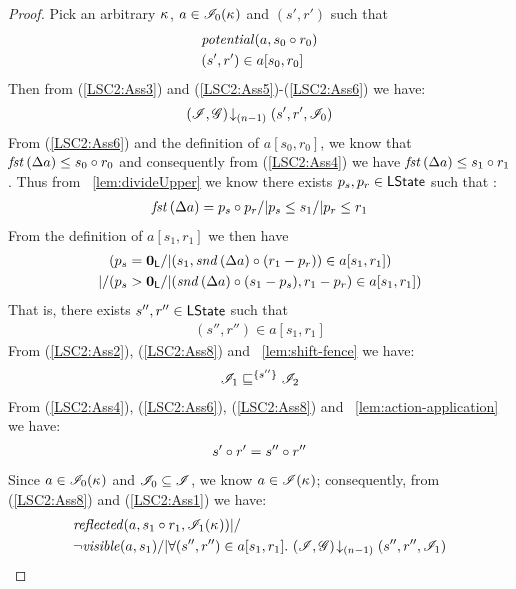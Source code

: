 \begin{lemma}
\begin{proof}
Pick an arbitrary $\kappa_{}$, $a \in \mathscr{I}_0(\kappa_{})$ and $(s', r')$ such that
%
\begin{align}
	& \mathit{potential}(a, s_0 \circ r_0) \label{LSC2:Ass5}\\
	& (s', r') \in a[s_0, r_0] \label{LSC2:Ass6}
\end{align}
Then from (\ref{LSC2:Ass3}) and (\ref{LSC2:Ass5})-(\ref{LSC2:Ass6}) we have:
%
\begin{align}
	\left(\mathscr{I}, \mathscr{G}\right) \!\downarrow_{(n-1)} \left(s', r', \mathscr{I}_0\right) \label{LSC2:Ass7}
\end{align}
%
From (\ref{LSC2:Ass6}) and the definition of $a[s_0, r_0]$, we know that $\mathit{fst}\left(\Delta {a}\right) \leq s_0 \circ r_0$ and consequently from (\ref{LSC2:Ass4}) we have $\mathit{fst}\left(\Delta {a}\right) \leq s_1 \circ r_1$. Thus from \lem~\ref{lem:divideUpper} we know there exists $p_s, p_r \in \textsf{LState}$ such that : 
%
\begin{align*}
	\mathit{fst}\left(\Delta {a}\right) = p_s \circ p_r /| p_s \leq s_1 /| p_r \leq r_1
\end{align*}
%
From the definition of $a[s_1, r_1]$ we then have
%
\begin{align*}
	& (p_s = \mathbf{0}_{\textsf{L}} /| (s_1, \mathit{snd}\left(\Delta {a}\right) \circ (r_1 -p_r)) \in a[s_1, r_1])\\
	|/ & (p_s > \mathbf{0}_{\textsf{L}} /| (\mathit{snd}\left(\Delta {a}\right) \circ (s_1 - p_s), r_1 - p_r) \in a[s_1, r_1]) 
\end{align*}
%
That is, there exists $s'', r'' \in \textsf{LState}$ such that
%
\begin{align}
	(s'', r'') \in a[s_1, r_1]
	\label{LSC2:Ass8}
\end{align}
%
From (\ref{LSC2:Ass2}), (\ref{LSC2:Ass8}) and \lem~\ref{lem:shift-fence} we have:
%
\begin{align}
	\mathscr{I}_1 \sqsubseteq^{\{s''\}} \mathscr{I}_2 \label{LSC2:Ass9}
\end{align}
%
From (\ref{LSC2:Ass4}), (\ref{LSC2:Ass6}), (\ref{LSC2:Ass8}) and \lem~\ref{lem:action-application} we have:
%
\begin{align}
	s' \circ r' = s'' \circ r'' \label{LSC2:Ass10}
\end{align}
%
Since $a \in \mathscr{I}_0(\kappa_{})$ and $\mathscr{I}_0 \subseteq \mathscr{I}$, we know $a \in \mathscr{I}(\kappa_{})$; consequently, from (\ref{LSC2:Ass8}) and (\ref{LSC2:Ass1}) we have: 
%
\begin{align*}
	& \m{reflected}(a, s_1 \composeL r_1, \lmod_1(\ca{})) |/\\
	& \neg\m{visible}(a, s_1) /| \for{(s'', r'') \in a[s_1, r_1]} \extendsAMUpto{\lmod, \gmod}{(n-1)}{s''}{r''}{\lmod_1} 

\end{align*}
\end{proof}
\end{lemma}
